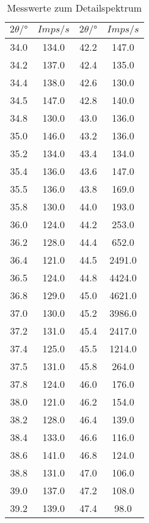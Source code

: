 \begin{table}[H]
    \centering
    \caption{Messwerte zum Detailspektrum}
    \label{tab:3}
    \begin{tabular}{c c | c c }
        \toprule
        $2 \theta /° $ & $Imps/s$ & $2 \theta /°$ & $Imps/s$ \\
        \midrule
        34.0  & 	134.0   & 42.2  &	147.0  \\
        34.2  & 	137.0   & 42.4  &	135.0  \\
        34.4  & 	138.0   & 42.6  &	130.0  \\
        34.5  & 	147.0   & 42.8  &	140.0  \\
        34.8  & 	130.0   & 43.0  &	136.0  \\
        35.0  & 	146.0   & 43.2  &	136.0  \\
        35.2  & 	134.0   & 43.4  &	134.0  \\
        35.4  & 	136.0   & 43.6  &	147.0  \\
        35.5  & 	136.0   & 43.8  &	169.0  \\
        35.8  & 	130.0   & 44.0  &	193.0  \\
        36.0  & 	124.0   & 44.2  &	253.0  \\
        36.2  & 	128.0   & 44.4  &	652.0  \\
        36.4  & 	121.0   & 44.5  &	2491.0 \\
        36.5  & 	124.0   & 44.8  &	4424.0 \\
        36.8  & 	129.0   & 45.0  &	4621.0 \\
        37.0  & 	130.0   & 45.2  &	3986.0 \\
        37.2  & 	131.0   & 45.4  &	2417.0 \\
        37.4  & 	125.0   & 45.5  &	1214.0 \\
        37.5  & 	131.0   & 45.8  &	264.0  \\
        37.8  & 	124.0   & 46.0  &	176.0  \\
        38.0  & 	121.0   & 46.2  &	154.0  \\
        38.2  & 	128.0   & 46.4  &	139.0  \\
        38.4  & 	133.0   & 46.6  &	116.0  \\
        38.6  & 	141.0   & 46.8  &	124.0  \\
        38.8  & 	131.0   & 47.0  &	106.0  \\
        39.0  & 	137.0   & 47.2  &	108.0  \\
        39.2  & 	139.0   & 47.4  &	98.0  \\

\end{tabular}
\end{table}

